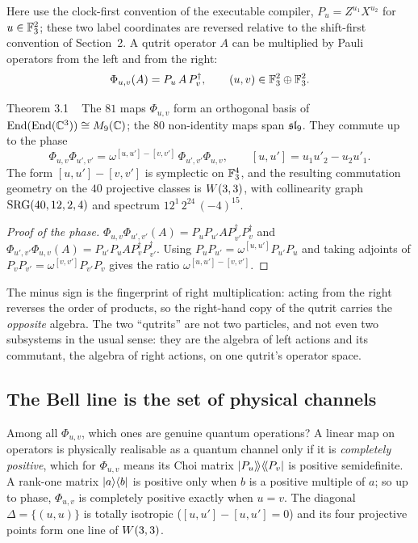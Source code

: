 Here use the clock-first convention of the executable compiler,
$P_u=Z^{u_1}X^{u_2}$ for $u\in\mathbb{F}_3^2$; these two label coordinates are reversed
relative to the shift-first convention of Section~2. A qutrit operator $A$ can be multiplied by
Pauli operators from the left and from the right:
\[
\Phi_{u,v}(A)=P_u\,A\,P_v^\dagger ,\qquad (u,v)\in\mathbb{F}_3^2\oplus\mathbb{F}_3^2 .
\]

\begin{result}{Theorem 3.1 \hfill \tierT\ \tierC}
The $81$ maps $\Phi_{u,v}$ form an orthogonal basis of $\mathrm{End}(\mathrm{End}(\mathbb{C}^3))\cong M_9(\mathbb{C})$;
the $80$ non-identity maps span $\mathfrak{sl}_9$. They commute up to the phase
\[
\Phi_{u,v}\Phi_{u',v'}=\omega^{[u,u']-[v,v']}\,\Phi_{u',v'}\Phi_{u,v},
\qquad [u,u']=u_1u'_2-u_2u'_1 .
\]
The form $[u,u']-[v,v']$ is symplectic on $\mathbb{F}_3^4$, and the resulting commutation
geometry on the $40$ projective classes is $W(3,3)$, with collinearity graph
$\mathrm{SRG}(40,12,2,4)$ and spectrum $12^1\,2^{24}\,(-4)^{15}$.
\end{result}

\begin{proof}[Proof of the phase]
$\Phi_{u,v}\Phi_{u',v'}(A)=P_uP_{u'}AP_{v'}^\dagger P_v^\dagger$ and
$\Phi_{u',v'}\Phi_{u,v}(A)=P_{u'}P_uAP_v^\dagger P_{v'}^\dagger$. Using
$P_uP_{u'}=\omega^{[u,u']}P_{u'}P_u$ and taking adjoints of
$P_vP_{v'}=\omega^{[v,v']}P_{v'}P_v$ gives the ratio $\omega^{[u,u']-[v,v']}$.
\end{proof}

The minus sign is the fingerprint of right multiplication: acting from the right reverses
the order of products, so the right-hand copy of the qutrit carries the \emph{opposite}
algebra. The two ``qutrits'' are not two particles, and not even two subsystems in the
usual sense: they are the algebra of left actions and its commutant, the algebra of right
actions, on one qutrit's operator space.

\subsection{The Bell line is the set of physical channels}

Among all $\Phi_{u,v}$, which ones are genuine quantum operations? A linear map on
operators is physically realisable as a quantum channel only if it is \emph{completely
positive}, which for $\Phi_{u,v}$ means its Choi matrix
$\lvert P_u\rangle\!\rangle\langle\!\langle P_v\rvert$ is positive semidefinite. A rank-one matrix
$\lvert a\rangle\langle b\rvert$ is positive only when $b$ is a positive multiple of $a$; so up to phase,
$\Phi_{u,v}$ is completely positive exactly when $u=v$. The diagonal
$\Delta=\{(u,u)\}$ is totally isotropic ($[u,u']-[u,u']=0$) and its four projective points
form one line of $W(3,3)$.

